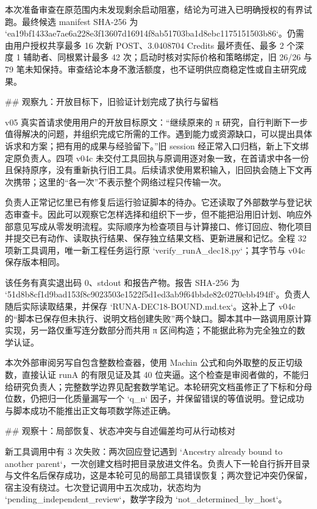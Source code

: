 本次准备审查在原范围内未发现剩余启动阻塞，结论为可进入已明确授权的有界试跑。最终候选 manifest SHA-256 为 `ea19bf1433ae7ae6a228e3f13607d16914f8ab51703ba1d8ebc1175151503b86`。仍需由用户授权共享最多 16 次新 POST、3.0408704 Credits 最坏责任、最多 2 个深度 1 辅助者、同根累计最多 42 次；启动时核对实际价格和策略绑定，旧 26/26 与 79 笔未知保持。审查结论本身不激活额度，也不证明供应商稳定性或自主研究成果。

## 观察九：开放目标下，旧验证计划完成了执行与留档

v05 真实首请求使用用户的开放目标原文：“继续原来的 π 研究，自行判断下一步值得解决的问题，并组织完成它所需的工作。遇到能力或资源缺口，可以提出具体诉求和方案；把有用的成果与经验留下。”旧 session 经正常入口归档，新上下文绑定原负责人。四项 v04c 未交付工具回执与原调用逐对象一致，在首请求中各一份且保持原序，没有重新执行旧工具。后续请求使用累积输入，旧回执会随上下文再次携带；这里的“各一次”不表示整个网络过程只传输一次。

负责人正常记忆里已有修复后运行验证脚本的待办。它还读取了外部数学与登记状态审查卡。因此可以观察它怎样选择和组织下一步，但不能把沿用旧计划、响应外部意见写成从零发明流程。实际顺序为检查项目与计算接口、修订回应、物化项目并提交已有动作、读取执行结果、保存独立结果文档、更新进展和记忆。全程 32 项新工具调用，唯一新工程任务运行原 `verify_runA_dec18.py`；其字节与 v04c 保存版本相同。

该任务有真实退出码 0、stdout 和报告产物。报告 SHA-256 为 `51d8b8cf1d9bad153f8c9023503e1522f5d1ed3ab9f64bbde82c0270ebb494ff`。负责人随后实际读取结果，并保存 `RUNA-DEC18-BOUND.md.tex`。这补上了 v04c 的“脚本已保存但未执行、说明文档创建失败”两个缺口。脚本其中一路调用原计算实现，另一路仅重写连分数部分而共用 π 区间构造；不能据此称为完全独立的数学认证。

本次外部审阅另写自包含整数检查器，使用 Machin 公式和向外取整的反正切级数，直接认证 runA 的有限见证及其 40 位夹逼。这个检查是审阅者做的，不能归给研究负责人；完整数学边界见配套数学笔记。本轮研究文档虽修正了下标和分母位数，仍把归一化质量漏写一个 `q_n` 因子，并保留错误的等值说明。登记成功与脚本成功不能推出正文每项数学陈述正确。

## 观察十：局部恢复、状态冲突与自述偏差均可从行动核对

新工具调用中有 3 次失败：两次回应登记遇到 `Ancestry already bound to another parent`，一次创建文档时把目录放进文件名。负责人下一轮自行拆开目录与文件名后保存成功，这是本轮可见的局部工具错误恢复；两次登记冲突仍保留，宿主没有绕过。七次登记调用中五次成功，状态均为 `pending_independent_review`，数学字段为 `not_determined_by_host`。

